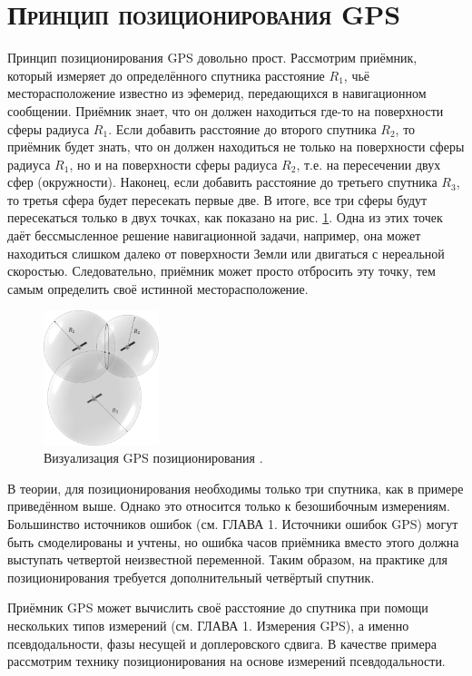 \section{\textsc{Принцип позиционирования GPS}}

Принцип позиционирования GPS довольно прост.
Рассмотрим приёмник, который измеряет до определённого спутника расстояние $R_1$, чьё месторасположение известно из эфемерид, передающихся в навигационном сообщении.
Приёмник знает, что он должен находиться где-то на поверхности сферы радиуса $R_1$.
Если добавить расстояние до второго спутника $R_2$, то приёмник будет знать, что он должен находиться не только на поверхности сферы радиуса $R_1$, но и на поверхности сферы радиуса $R_2$, т.е. на пересечении двух сфер (окружности).
Наконец, если добавить расстояние до третьего спутника $R_3$, то третья сфера будет пересекать первые две.
В итоге, все три сферы будут пересекаться только в двух точках, как показано на рис. \ref{fig-positioning}.
Одна из этих точек даёт бессмысленное решение навигационной задачи, например, она может находиться слишком далеко от поверхности Земли или двигаться с нереальной скоростью.
Следовательно, приёмник может просто отбросить эту точку, тем самым определить своё истинной месторасположение. 
\begin{figure}[h]
\centering    
\includegraphics[width=0.3\textwidth]{fig/positioning.png}    
\caption{Визуализация GPS позиционирования \cite{Seeber2003}.}
\label{fig-positioning}      
\end{figure}

В теории, для позиционирования необходимы только три спутника, как в примере приведённом выше.
Однако это относится только к безошибочным измерениям.
Большинство источников ошибок (см. ГЛАВА 1. Источники ошибок GPS) могут быть смоделированы и учтены, но ошибка часов приёмника вместо этого должна выступать четвертой неизвестной переменной.
Таким образом, на практике для позиционирования требуется дополнительный четвёртый спутник.

Приёмник GPS может вычислить своё расстояние до спутника при помощи нескольких типов измерений (см. ГЛАВА 1. Измерения GPS), а именно псевдодальности, фазы несущей и доплеровского сдвига.
В качестве примера рассмотрим технику позиционирования на основе измерений псевдодальности.

